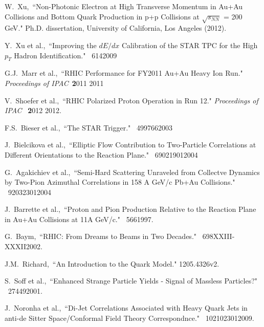 \begin{thebibliography}{1000}
W.~Xu,~``Non-Photonic Electron at High Transverse Momentum in Au+Au Collisions and Bottom Quark Production in p+p Collisions at $\sqrt{s_{NN}}$ = 200 GeV." Ph.D. dissertation, University of California, Los Angeles (2012).

Y.~Xu et al.,~``Improving the $dE/dx$ Calibration of the STAR TPC for the High $p_T$ Hadron Identification." \Journal{\NIM} {~614}{}{2009}

G.J.~Marr et al.,~``RHIC Performance for FY2011 Au+Au Heavy Ion Run." \textit {Proceedings of IPAC}~{\textbf 2011} {2011}

V.~Shoefer et al.,~``RHIC Polarized Proton Operation in Run 12." \textit {Proceedings of IPAC}
~{\textbf 2012} {2012}.

F.S.~Bieser et al.,~``The STAR Trigger." \Journal{\NIM} {~499}{766}{2003}


J.~Bielcikova et al.,~``Elliptic Flow Contribution to Two-Particle Correlations at Different Orientations to the Reaction Plane." \Journal{\PRC} {~69}{021901}{2004}


G.~Agakichiev et al.,~``Semi-Hard Scattering Unraveled from Collectve Dynamics by Two-Pion Azimuthal Correlations in 158 A GeV/c Pb+Au Collisions." \Journal{\PRL} {~92}{032301}{2004}

J.~Barrette et al.,~``Proton and Pion Production Relative to the Reaction Plane in Au+Au Collisions at 11A GeV/c." \Journal{\PRC} {~56}{6}{1997}.

G.~Baym,~``RHIC: From Dreams to Beams in Two Decades." \Journal{\NPA} {~698}{XXIII-XXXII}{2002}.

J.M.~Richard,~``An Introduction to the Quark Model." \arXiv1205.4326v2.


S.~Soff et al.,~``Enhanced Strange Particle Yields - Signal of Massless Particles?" \Journal{\JPG} {~27}{449}{2001}.

J.~Noronha et al.,~``Di-Jet Correlations Associated with Heavy Quark Jets in anti-de Sitter Space/Conformal Field Theory Correspondnce." \Journal{\PRL} {~102}{102301}{2009}.


\end{thebibliography}
